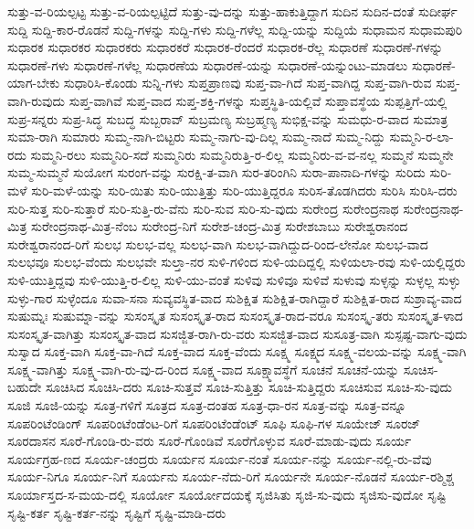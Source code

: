 {ಸುತ್ತು-ವ-ರಿಯಲ್ಪಟ್ಟ
ಸುತ್ತು-ವ-ರಿಯಲ್ಪಟ್ಟಿದೆ
ಸುತ್ತು-ವು-ದನ್ನು
ಸುತ್ತು-ಹಾಕುತ್ತಿದ್ದಾಗ
ಸುದಿನ
ಸುದಿನ-ದಂತೆ
ಸುದೀರ್ಘ
ಸುದ್ದಿ
ಸುದ್ದಿ-ಕಾರ-ರೊಡನೆ
ಸುದ್ದಿ-ಗಳನ್ನು
ಸುದ್ದಿ-ಗಳು
ಸುದ್ದಿ-ಗಳೆಲ್ಲ
ಸುದ್ದಿ-ಯನ್ನು
ಸುದ್ದಿಯೆ
ಸುಧಾಮನ
ಸುಧಾಮಪುರಿ
ಸುಧಾರಕ
ಸುಧಾರಕರ
ಸುಧಾರಕರು
ಸುಧಾರಕರೆ
ಸುಧಾರಕ-ರೆಂದರೆ
ಸುಧಾರಕ-ರೆಲ್ಲ
ಸುಧಾರಣೆ
ಸುಧಾರಣೆ-ಗಳನ್ನು
ಸುಧಾರಣೆ-ಗಳು
ಸುಧಾರಣೆ-ಗಳೆಲ್ಲ
ಸುಧಾರಣೆಯ
ಸುಧಾರಣೆ-ಯನ್ನು
ಸುಧಾರಣೆ-ಯನ್ನುಂಟು-ಮಾಡಲು
ಸುಧಾರಣೆ-ಯಾಗ-ಬೇಕು
ಸುಧಾರಿಸಿ-ಕೊಂಡು
ಸುನ್ನಿ-ಗಳು
ಸುಪ್ತಪ್ರಾಣವು
ಸುಪ್ತ-ವಾ-ಗಿದೆ
ಸುಪ್ತ-ವಾಗಿದ್ದ
ಸುಪ್ತ-ವಾಗಿ-ರುವ
ಸುಪ್ತ-ವಾಗಿ-ರುವುದು
ಸುಪ್ತ-ವಾಗಿವೆ
ಸುಪ್ತ-ವಾದ
ಸುಪ್ತ-ಶಕ್ತಿ-ಗಳನ್ನು
ಸುಪ್ತಸ್ಥಿತಿ-ಯಲ್ಲಿವೆ
ಸುಪ್ತಾವಸ್ಥೆಯ
ಸುಪ್ಪತ್ತಿಗೆ-ಯಲ್ಲಿ
ಸುಪ್ರ-ಸನ್ನರು
ಸುಪ್ರ-ಸಿದ್ಧ
ಸುಬದ್ಧ
ಸುಬ್ಬರಾವ್
ಸುಬ್ರಮಣ್ಯ
ಸುಬ್ರಹ್ಮಣ್ಯ
ಸುಭಿಕ್ಷ-ವನ್ನು
ಸುಮಧು-ರ-ವಾದ
ಸುಮಾತ್ರ
ಸುಮಾ-ರಾಗಿ
ಸುಮಾರು
ಸುಮ್ಮ-ನಾಗಿ-ಬಿಟ್ಟರು
ಸುಮ್ಮ-ನಾಗು-ವು-ದಿಲ್ಲ
ಸುಮ್ಮ-ನಾದೆ
ಸುಮ್ಮ-ನಿದ್ದು
ಸುಮ್ಮನಿ-ರ-ಲಾ-ರದು
ಸುಮ್ಮನಿ-ರಲು
ಸುಮ್ಮನಿರಿ-ಸದೆ
ಸುಮ್ಮನಿರು
ಸುಮ್ಮನಿರುತ್ತಿ-ರ-ಲಿಲ್ಲ
ಸುಮ್ಮನಿರು-ವ-ವ-ನಲ್ಲ
ಸುಮ್ಮನೆ
ಸುಮ್ಮನೇ
ಸುಮ್ಮ-ಸುಮ್ಮನೆ
ಸುಯೋಗ
ಸುರಂಗ-ವನ್ನು
ಸುರಕ್ಷಿ-ತ-ವಾಗಿ
ಸುರ-ತರಿಂಗಿನಿ
ಸುರಾ-ಪಾನಾದಿ-ಗಳನ್ನು
ಸುರಿದು
ಸುರಿ-ಮಳೆ
ಸುರಿ-ಮಳೆ-ಯನ್ನು
ಸುರಿ-ಯಿತು
ಸುರಿ-ಯುತ್ತಿತ್ತು
ಸುರಿ-ಯುತ್ತಿದ್ದರೂ
ಸುರಿಸ-ತೊಡಗಿದರು
ಸುರಿಸಿ
ಸುರಿಸಿ-ದರು
ಸುರಿ-ಸುತ್ತ
ಸುರಿ-ಸುತ್ತಾರೆ
ಸುರಿ-ಸುತ್ತಿ-ರು-ವೆನು
ಸುರಿ-ಸುವ
ಸುರಿ-ಸು-ವುದು
ಸುರೇಂದ್ರ
ಸುರೇಂದ್ರನಾಥ
ಸುರೇಂದ್ರನಾಥ-ಮಿತ್ರ
ಸುರೇಂದ್ರನಾಥ-ಮಿತ್ರ-ನೆಂಬ
ಸುರೇಂದ್ರ-ನಿಗೆ
ಸುರೇಶ-ಚಂದ್ರ-ಮಿತ್ರ
ಸುರೇಶಬಾಬು
ಸುರೇಶ್ವರಾನಂದ
ಸುರೇಶ್ವರಾನಂದ-ರಿಗೆ
ಸುಲಭ
ಸುಲಭ-ವಲ್ಲ
ಸುಲಭ-ವಾಗಿ
ಸುಲಭ-ವಾಗಿದ್ದುದ-ರಿಂದ-ಲೇನೋ
ಸುಲಭ-ವಾದ
ಸುಲಭವೂ
ಸುಲಭ-ವೆಂದು
ಸುಲಭವೇ
ಸುಲ್ತಾ-ನರ
ಸುಳಿ-ಗಳಿಂದ
ಸುಳಿ-ಯದಿದ್ದಲ್ಲಿ
ಸುಳಿಯಲಾ-ರವು
ಸುಳಿ-ಯಲ್ಲಿದ್ದರು
ಸುಳಿ-ಯುತ್ತಿದ್ದವು
ಸುಳಿ-ಯುತ್ತಿ-ರ-ಲಿಲ್ಲ
ಸುಳಿ-ಯು-ವಂತೆ
ಸುಳಿವು
ಸುಳಿವೂ
ಸುಳಿವೆ
ಸುಳುವು
ಸುಳ್ಳನ್ನು
ಸುಳ್ಳಲ್ಲ
ಸುಳ್ಳು
ಸುಳ್ಳು-ಗಾರ
ಸುಳ್ಳೆಂದೂ
ಸುವಾ-ಸನಾ
ಸುವ್ಯವಸ್ಥಿತ-ವಾದ
ಸುಶಿಕ್ಷಿತ
ಸುಶಿಕ್ಷಿತ-ರಾಗಿದ್ದಾರೆ
ಸುಶಿಕ್ಷಿತ-ರಾದ
ಸುಶ್ರಾವ್ಯ-ವಾದ
ಸುಷುಮ್ನಃ
ಸುಷುಮ್ನಾ-ವನ್ನು
ಸುಸಂಸ್ಕೃತ
ಸುಸಂಸ್ಕೃತ-ರಾದ
ಸುಸಂಸ್ಕೃತ-ರಾದ-ವರೂ
ಸುಸಂಸ್ಕೃ-ತರು
ಸುಸಂಸ್ಕೃತ-ಳಾದ
ಸುಸಂಸ್ಕೃತ-ವಾಗಿತ್ತು
ಸುಸಂಸ್ಕೃತ-ವಾದ
ಸುಸಜ್ಜಿತ-ರಾಗಿ-ರು-ವರು
ಸುಸಜ್ಜಿತ-ವಾದ
ಸುಸೂತ್ರ-ವಾಗಿ
ಸುಸ್ಪಷ್ಟ-ವಾಗು-ವುದು
ಸುಸ್ವಾದ
ಸೂಕ್ತ-ವಾಗಿ
ಸೂಕ್ತ-ವಾ-ಗಿದೆ
ಸೂಕ್ತ-ವಾದ
ಸೂಕ್ತ-ವೆಂದು
ಸೂಕ್ಷ್ಮ
ಸೂಕ್ಷ್ಮದ
ಸೂಕ್ಷ್ಮ-ವಲಯ-ವನ್ನು
ಸೂಕ್ಷ್ಮ-ವಾಗಿ
ಸೂಕ್ಷ್ಮ-ವಾಗಿತ್ತು
ಸೂಕ್ಷ್ಮ-ವಾಗಿ-ರು-ವು-ದ-ರಿಂದ
ಸೂಕ್ಷ್ಮ-ವಾದ
ಸೂಕ್ಷ್ಮಾವಸ್ಥೆಗೆ
ಸೂಚನೆ
ಸೂಚನೆ-ಯನ್ನು
ಸೂಚಿಸ-ಬಹುದೇ
ಸೂಚಿಸಿದ
ಸೂಚಿಸಿ-ದರು
ಸೂಚಿ-ಸುತ್ತವೆ
ಸೂಚಿ-ಸುತ್ತಿತ್ತು
ಸೂಚಿ-ಸುತ್ತಿದ್ದರು
ಸೂಚಿಸುವ
ಸೂಚಿ-ಸು-ವುದು
ಸೂಜಿ
ಸೂಜಿ-ಯನ್ನು
ಸೂತ್ರ-ಗಳಿಗೆ
ಸೂತ್ರದ
ಸೂತ್ರ-ದಂತಹ
ಸೂತ್ರ-ಧಾ-ರನ
ಸೂತ್ರ-ವನ್ನು
ಸೂತ್ರ-ವನ್ನೂ
ಸೂಪರಿಂಟೆಂಡಿಂಗ್
ಸೂಪರಿಂಟೆಂಡೆಂಟ-ರಿಗೆ
ಸೂಪರಿಂಟೆಂಡೆಂಟ್
ಸೂಫಿ
ಸೂಫಿ-ಗಳ
ಸೂಯೇಜ್
ಸೂರಜ್
ಸೂರದಾಸನ
ಸೂರೆ-ಗೊಂಡಿ-ರು-ವರು
ಸೂರೆ-ಗೊಂಡಿವೆ
ಸೂರೆಗೊಳ್ಳುವ
ಸೂರೆ-ಮಾಡು-ವುದು
ಸೂರ್ಯ
ಸೂರ್ಯಗ್ರಹ-ಣದ
ಸೂರ್ಯ-ಚಂದ್ರರು
ಸೂರ್ಯನ
ಸೂರ್ಯ-ನಂತೆ
ಸೂರ್ಯ-ನನ್ನು
ಸೂರ್ಯ-ನಲ್ಲಿ-ರು-ವೆವು
ಸೂರ್ಯ-ನಿಗೂ
ಸೂರ್ಯ-ನಿಗೆ
ಸೂರ್ಯನು
ಸೂರ್ಯ-ನೆದು-ರಿಗೆ
ಸೂರ್ಯನೇ
ಸೂರ್ಯ-ನೊಡನೆ
ಸೂರ್ಯ-ರಶ್ಮಿಶ್ಚ
ಸೂರ್ಯಾಸ್ತದ-ಸ-ಮಯ-ದಲ್ಲಿ
ಸೂರ್ಯೋ
ಸೂರ್ಯೋದಯಕ್ಕೆ
ಸೃಜಿಸಿತು
ಸೃಜಿ-ಸು-ವುದು
ಸೃಜಿಸು-ವುದೋ
ಸೃಷ್ಟಿ
ಸೃಷ್ಟಿ-ಕರ್ತ
ಸೃಷ್ಟಿ-ಕರ್ತ-ನನ್ನು
ಸೃಷ್ಟಿಗೆ
ಸೃಷ್ಟಿ-ಮಾಡಿ-ದರು
}
